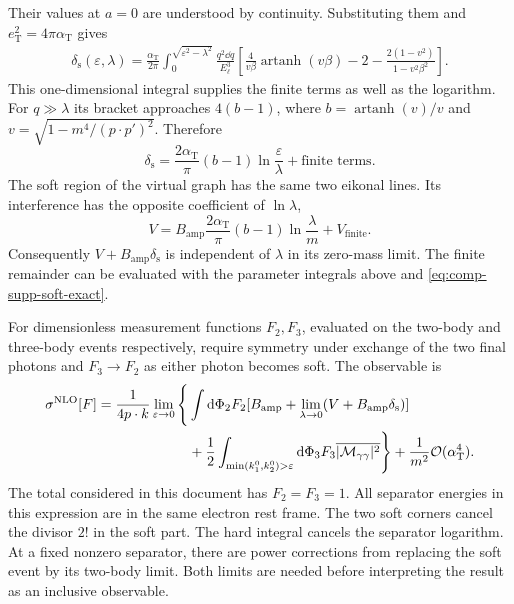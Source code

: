 Their values at $a=0$ are understood by continuity. Substituting them
and $e_{\mathrm T}^2=4\pi\alpha_{\mathrm T}$ gives
\begin{equation}
 \begin{aligned}
 \delta_{\mathrm s}(\varepsilon,\lambda)
 =\frac{\alpha_{\mathrm T}}{2\pi}
 \int_0^{\sqrt{\varepsilon^2-\lambda^2}}
 \frac{q^2\dd q}{E_\ell^3}
 \left[\frac4{v\beta}\operatorname{artanh}(v\beta)
       -2-\frac{2(1-v^2)}{1-v^2\beta^2}\right].
 \end{aligned}
 \label{eq:comp-supp-soft-exact}
\end{equation}
This one-dimensional integral supplies the finite terms as well as
the logarithm. For $q\gg\lambda$ its bracket approaches $4(b-1)$,
where $b=\operatorname{artanh}(v)/v$ and
$v=\sqrt{1-m^4/(p\cdot p')^2}$. Therefore
\begin{equation}
 \delta_{\mathrm s}=
 \frac{2\alpha_{\mathrm T}}\pi(b-1)\ln\frac\varepsilon\lambda
 +\text{finite terms}.
\end{equation}
The soft region of the virtual graph has the same two eikonal
lines. Its interference has the opposite coefficient of
$\ln\lambda$,
\begin{equation}
 V=B_{\mathrm{amp}}\frac{2\alpha_{\mathrm T}}\pi(b-1)\ln\frac\lambda m
                   +V_{\mathrm{finite}}.
\end{equation}
Consequently $V+B_{\mathrm{amp}}\delta_{\mathrm s}$ is independent of $\lambda$
in its zero-mass limit. The finite remainder can be evaluated with
the parameter integrals above and \eqref{eq:comp-supp-soft-exact}.

For dimensionless measurement functions $F_2,F_3$, evaluated on
the two-body and three-body events respectively, require symmetry
under exchange of the two final photons
and $F_3\to F_2$ as either photon becomes soft. The observable is
\begin{equation}
 \begin{aligned}
 \sigma^{\mathrm{NLO}}[F]=\frac1{4p\cdot k}
 \lim_{\varepsilon\to0}\Bigg\{&\int\dd\Phi_2F_2
 [B_{\mathrm{amp}}+\lim_{\lambda\to0}(V+B_{\mathrm{amp}}\delta_{\mathrm s})]\\
 &+\frac12\int_{\min(k_1^0,k_2^0)>\varepsilon}
 \dd\Phi_3 F_3\overline{|\mathcal M_{\gamma\gamma}|^2}\Bigg\}
 +\frac1{m^2}\mathcal{O}(\alpha_{\mathrm T}^4).
 \end{aligned}
\end{equation}
The total considered in this document has $F_2=F_3=1$.
All separator energies in this expression are in the same electron
rest frame. The two soft corners cancel the divisor $2!$ in the
soft part. The hard integral cancels the separator logarithm.
At a fixed nonzero separator, there are power corrections from
replacing the soft event by its two-body limit. Both limits are
needed before interpreting the result as an inclusive observable.
